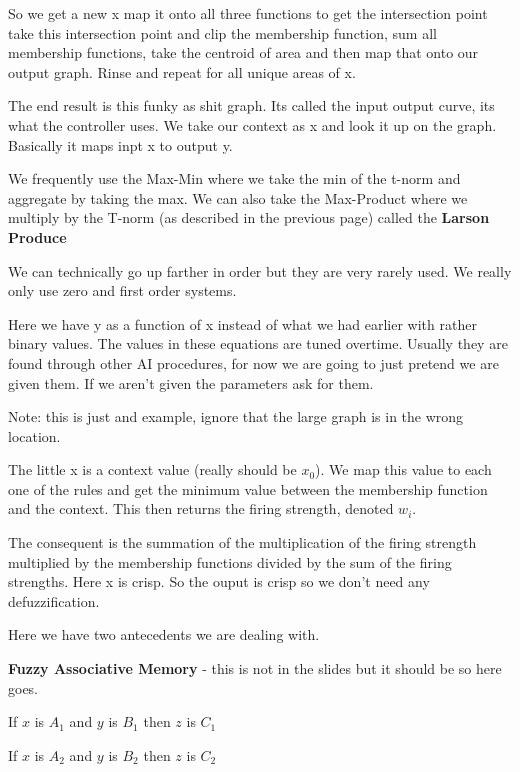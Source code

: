 \documentclass{article}
\begin{document}
So we get a new x map it onto all three functions to get the intersection point take this intersection point and clip the membership function, sum all membership functions, take the centroid of area and then map that onto our output graph. Rinse and repeat for all unique areas of x.


The end result is this funky as shit graph. Its called the input output curve, its what the controller uses. We take our context as x and look it up on the graph. Basically it maps inpt x to output y.

We frequently use the Max-Min where we take the min of the t-norm and aggregate by taking the max. We can also take the Max-Product where we multiply by the T-norm (as described in the previous page) called the \textbf{Larson Produce}


We can technically go up farther in order but they are very rarely used. We really only use zero and first order systems.

Here we have y as a function of x instead of what we had earlier with rather binary values. The values in these equations are tuned overtime. Usually they are found through other AI procedures, for now we are going to just pretend we are given them. If we aren't given the parameters ask for them.


Note: this is just and example, ignore that the large graph is in the wrong location.

The little x is a context value (really should be $x_0$). We map this value to each one of the rules and get the minimum value between the membership function and the context. This then returns the firing strength, denoted $w_i$.

The consequent is the summation of the multiplication of the firing strength multiplied by the membership functions divided by the sum of the firing strengths. Here x is crisp. So the ouput is crisp so we don't need any defuzzification.


Here we have two antecedents we are dealing with.




\textbf{Fuzzy Associative Memory} - this is not in the slides but it should be so here goes.

If $x$ is $A_1$ and $y$ is $B_1$ then $z$ is $C_1$

If $x$ is $A_2$ and $y$ is $B_2$ then $z$ is $C_2$
\end{document}
